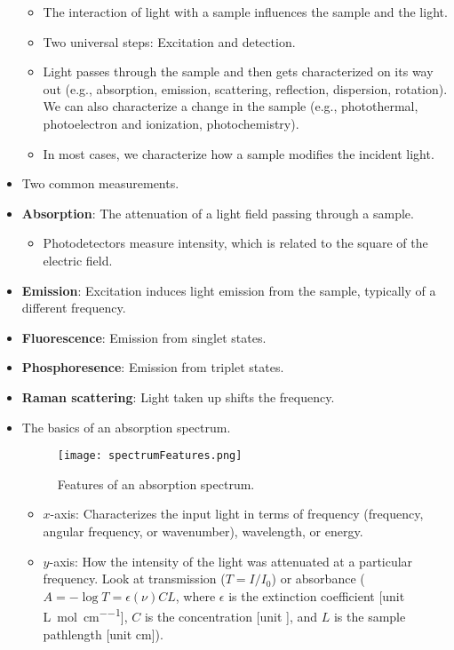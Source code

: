 \documentclass[../notes.tex]{subfiles}
\begin{document}
\begin{itemize}
    \begin{itemize}
        \item The interaction of light with a sample influences the sample and the light.
        \item Two universal steps: Excitation and detection.
        \item Light passes through the sample and then gets characterized on its way out (e.g., absorption, emission, scattering, reflection, dispersion, rotation). We can also characterize a change in the sample (e.g., photothermal, photoelectron and ionization, photochemistry).
        \item In most cases, we characterize how a sample modifies the incident light.
    \end{itemize}
    \item Two common measurements.
    \item \textbf{Absorption}: The attenuation of a light field passing through a sample.
    \begin{itemize}
        \item Photodetectors measure intensity, which is related to the square of the electric field.
    \end{itemize}
    \item \textbf{Emission}: Excitation induces light emission from the sample, typically of a different frequency.
    \item \textbf{Fluorescence}: Emission from singlet states.
    \item \textbf{Phosphoresence}: Emission from triplet states.
    \item \textbf{Raman scattering}: Light taken up shifts the frequency.
    \item The basics of an absorption spectrum.
    \begin{figure}[h!]
        \centering
        \texttt{[image: spectrumFeatures.png]}
        \caption{Features of an absorption spectrum.}
        \label{fig:spectrumFeatures}
    \end{figure}
    \begin{itemize}
        \item $x$-axis: Characterizes the input light in terms of frequency (frequency, angular frequency, or wavenumber), wavelength, or energy.
        \item $y$-axis: How the intensity of the light was attenuated at a particular frequency. Look at transmission ($T=I/I_0$) or absorbance ($A=-\log T=\epsilon(\nu)CL$, where $\epsilon$ is the extinction coefficient [unit \si{\liter\per\mole\per\centi\meter}], $C$ is the concentration [unit \si{\molar}], and $L$ is the sample pathlength [unit \si{\centi\meter}]).

\end{itemize}
\end{itemize}
\end{document}
